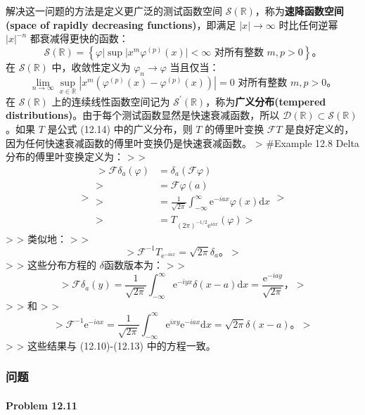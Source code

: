 解决这一问题的方法是定义更广泛的测试函数空间
$\mathcal{S}(\mathbb{R})$，称为\textbf{速降函数空间(space of rapidly decreasing functions)}，即满足
$|x| \to \infty$ 时比任何逆幂 $|x|^{-n}$ 都衰减得更快的函数：
 $$
\mathcal{S}(\mathbb{R}) = \left\{\varphi | \sup |x^m \varphi^{(p)}(x)| < \infty \text{ 对所有整数 } m, p > 0 \right\}。
$$
在 $\mathcal{S}(\mathbb{R})$ 中，收敛性定义为
$\varphi_n \to \varphi$ 当且仅当：
 $$
\lim_{n \to \infty} \sup_{x \in \mathbb{R}} \left|x^m \left(\varphi^{(p)}(x) - \varphi^{(p)}(x)\right)\right| = 0 \text{ 对所有整数 } m, p > 0。
$$
在 $\mathcal{S}(\mathbb{R})$ 上的连续线性函数空间记为
$\mathcal{S}^\prime(\mathbb{R})$，称为\textbf{广义分布(tempered distributions)}。由于每个测试函数显然是快速衰减函数，所以
$\mathcal{D}(\mathbb{R}) \subset \mathcal{S}(\mathbb{R})$。如果 $T$
是公式 (12.14) 中的广义分布，则 $T$ 的傅里叶变换 $\mathcal{F} T$
是良好定义的，因为任何快速衰减函数的傅里叶变换仍是快速衰减函数。
\textgreater{} \#Example 12.8 Delta分布的傅里叶变换定义为：
\textgreater{} \textgreater{} $$
> \begin{aligned}
> \mathcal{F} \delta_{a}(\varphi) & = \delta_{a}(\mathcal{F} \varphi) \\
> & = \mathcal{F} \varphi(a) \\
> & = \frac{1}{\sqrt{2 \pi}} \int_{-\infty}^\infty \mathrm{e}^{-i a x} \varphi(x) \mathrm{d} x \\
> & = T_{(2 \pi)^{-1 / 2} \mathrm{e}^{i a x}}(\varphi)
> \end{aligned}
> $$ \textgreater{} \textgreater{} 类似地： \textgreater{}
\textgreater{} $$
> \mathcal{F}^{-1} T_{\mathrm{e}^{-i a x}} = \sqrt{2 \pi} \delta_{a}。
> $$ \textgreater{} \textgreater{} 这些分布方程的 $\delta$函数版本为：
\textgreater{} \textgreater{} $$
> \mathcal{F} \delta_{a}(y) = \frac{1}{\sqrt{2 \pi}} \int_{-\infty}^\infty \mathrm{e}^{-i y x} \delta(x-a) \mathrm{d} x = \frac{\mathrm{e}^{-i a y}}{\sqrt{2 \pi}}，
> $$ \textgreater{} \textgreater{} 和 \textgreater{} \textgreater{} $$
> \mathcal{F}^{-1} \mathrm{e}^{-i a x} = \frac{1}{\sqrt{2 \pi}} \int_{-\infty}^\infty \mathrm{e}^{i x y} \mathrm{e}^{-i a x} \mathrm{d} x = \sqrt{2 \pi} \delta(x-a)。
> $$ \textgreater{} \textgreater{} 这些结果与 (12.10)-(12.13)
中的方程一致。

\subsubsection{问题}\label{ux95eeux9898-2}

\paragraph{Problem 12.11}\label{problem-12.11}

